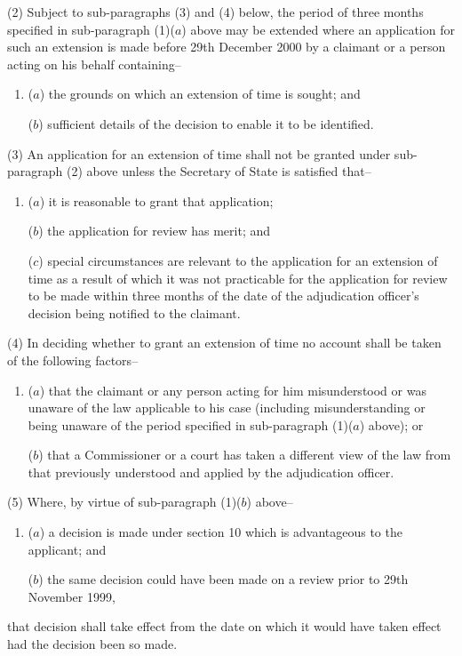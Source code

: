 \documentclass[12pt,a4paper]{article}
\begin{document}
(2) Subject to sub-paragraphs (3) and (4) below, the period of three months specified in sub-paragraph (1)($a$)  above may be extended where an application for such an extension is made before 29th December 2000 by a claimant or a person acting on his behalf containing–
\begin{enumerate}\item[]
($a$) the grounds on which an extension of time is sought; and

($b$) sufficient details of the decision to enable it to be identified.
\end{enumerate}

(3) An application for an extension of time shall not be granted under sub-paragraph (2) above unless the Secretary of State is satisfied that–
\begin{enumerate}\item[]
($a$) it is reasonable to grant that application;

($b$) the application for review has merit; and

($c$) special circumstances are relevant to the application for an extension of time as a result of which it was not practicable for the application for review to be made within three months of the date of the adjudication officer’s decision being notified to the claimant.
\end{enumerate}

(4) In deciding whether to grant an extension of time no account shall be taken of the following factors–
\begin{enumerate}\item[]
($a$) that the claimant or any person acting for him misunderstood or was unaware of the law applicable to his case (including misunderstanding or being unaware of the period specified in sub-paragraph (1)($a$)  above); or

($b$) that a Commissioner or a court has taken a different view of the law from that previously understood and applied by the adjudication officer.
\end{enumerate}

(5) Where, by virtue of sub-paragraph (1)($b$)  above–
\begin{enumerate}\item[]
($a$) a decision is made under section 10 which is advantageous to the applicant; and

($b$) the same decision could have been made on a review prior to 29th November 1999,
\end{enumerate}
that decision shall take effect from the date on which it would have taken effect had the decision been so made.
\end{document}
